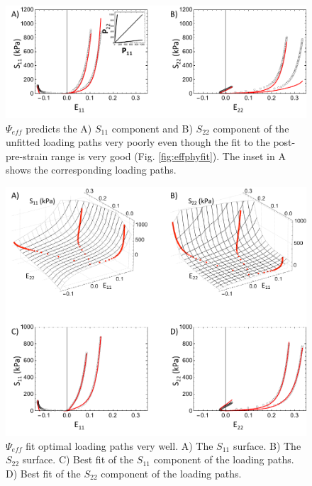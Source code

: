 \begin{figure}[hptb]
\centering
\includegraphics[width=6.5in]{Figures/effphypred}
\caption{$\Psi_{eff}$ predicts the A) $S_{11}$ component and B) $S_{22}$ component of the unfitted loading paths very poorly even though the fit to the post-pre-strain range is very good (Fig. \ref{fig:effphyfit}). The inset in A shows the corresponding loading paths.}
\label{fig:effphypred}
\end{figure} 


	

\begin{figure}[hptb]
\centering
\includegraphics[width=6.5in]{Figures/effoptfit}
\caption{$\Psi_{eff}$ fit optimal loading paths very well. A) The $S_{11}$ surface. B) The $S_{22}$ surface. C) Best fit of the $S_{11}$ component of the loading paths. D) Best fit of the $S_{22}$ component of the loading paths.}
\label{fig:effoptfit}
\end{figure} 

